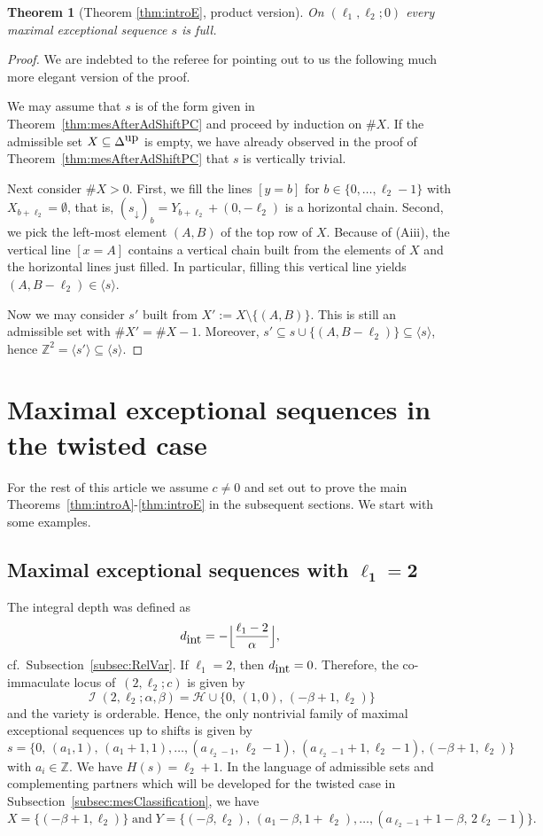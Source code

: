 \documentclass[11pt]{article}
\newtheorem{theorem}[theo]{Theorem}
\theoremstyle{definition}
\numberwithin{equation}{section}
\newcommand{\cH}{\mathcal{H}}
\newcommand{\Z}{\mathbb Z}
\newcommand{\CI}{{\mathcal I}}
\newcommand{\nImm}{\operatorname{\CI}}
\newcommand{\xa}{\alpha}
\newcommand{\xb}{\beta}
\newcommand{\cl}{s}
\newcommand{\clDown}{s_{\downarrow}}
\newcommand{\DeltaUp}{\Delta^{\mbox{\tiny up}}}
\newcommand{\hZ}{d_{\mbox{\rm\tiny int}}}
\newcommand{\mes}{maximal exceptional sequence}
\newcommand{\ssect}[1]{Subsection~\ref{#1}}
\newcommand{\thLex}{\ref{thm:introA}}
\newcommand{\thFull}{\ref{thm:introE}}
\begin{document}
\begin{theorem}[Theorem {\thFull}, 
product version]
\label{thm:FullnessTheoremPaPb}
On $(\ell_1,\ell_2;0)$ every maximal 
exceptional sequence $\cl$ is full.
\end{theorem}

\begin{proof}
{We are indebted to the referee for pointing out to us the following much more elegant version of the proof.

We may assume that $\cl$ is of the form
given in Theorem~\ref{thm:mesAfterAdShiftPC} and proceed 
by induction on $\#X$.
If the admissible set 
$X\subseteq \DeltaUp$ is empty, we have already observed in the proof
of Theorem~\ref{thm:mesAfterAdShiftPC} that $\cl$ is
vertically trivial. 

Next consider $\#X>0$. First, we fill the lines $[y=b]$ for
$b\in\{0,\ldots,\ell_2-1\}$
with $X_{b+\ell_2}=\emptyset$, that is,
$(\clDown)_b = Y_{b+\ell_2}+(0,-\ell_2)$ is a horizontal chain.
Second, we pick the left-most element $(A,B)$ of the top row of $X$.
Because of (Aiii), the vertical line $[x=A]$ contains a vertical chain built
from the elements of $X$ and the horizontal lines just filled. 
In particular, filling this vertical line yields
$(A,B-\ell_2)\in\langle\cl\rangle$.

Now we may consider $\cl'$ built from $X':=X\setminus\{(A,B)\}$.
This is still an admissible set with $\#X'=\#X-1$. Moreover,
$\cl'\subseteq\cl\cup\{(A,B-\ell_2)\}\subseteq\langle\cl\rangle$,
hence $\Z^2=\langle\cl'\rangle\subseteq\langle\cl\rangle$.}\end{proof}

\section{Maximal exceptional sequences 
in the twisted case}
\label{sec:MES}
For the rest of this article we assume 
$c\not=0$ and set out to prove the main 
Theorems~\mbox{\thLex-\thFull} in the subsequent sections.
We start with some examples.

\subsection{Maximal exceptional sequences 
with \texorpdfstring{$\mathbf{\ell_1=2}$}{l1=2}}\label{subsec:ExamL1}
The integral depth was defined as
$$
\hZ=-\Big\lfloor{\frac{\ell_1-2}{\xa}}\Big\rfloor,
$$
cf.\ \ssect{subsec:RelVar}. 
If $\ell_1=2$, then $\hZ=0$. Therefore, the 
{co-immaculate} locus of~$(2,\ell_2;c)$ 
is given by
$$
\nImm(2,\ell_2;\xa,\xb)=\cH\cup
\{0,\,(1,0),\,(-\xb+1,\ell_2)\}
$$
and the variety is orderable. 
Hence, the only nontrivial family of 
{\mes}s up to shifts is given by
$$
\cl=\{0,\,(a_1,1),\,(a_1+1,1),\ldots,
(a_{\ell_2-1},\,\ell_2-1),\,
(a_{\ell_2-1}+1,\ell_2-1),(-\xb+1,\ell_2)\}
$$
with $a_i\in\Z$. We have $H(\cl)=\ell_2+1$.
In the language of admissible sets and 
complementing partners which will be developed 
for the twisted case in 
\ssect{subsec:mesClassification},
we have 
$$
X=\{(-\xb+1,\ell_2)\}\;\mbox{and}\; 
Y=\{(-\xb,\ell_2),\,(a_1-\xb,1+\ell_2),\ldots,
(a_{\ell_2-1}+1-\xb,\,2\ell_2-1)\}.
$$
\end{document}
